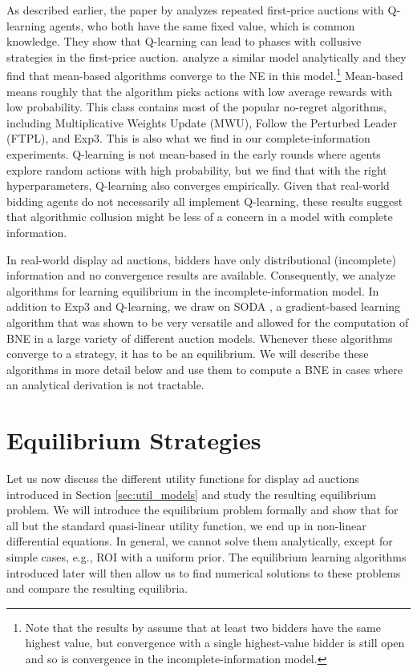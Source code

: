 \documentclass{article}
\begin{document}
As described earlier, the paper by \citet{banchio2022artificial} analyzes repeated first-price auctions with Q-learning agents, who both have the same fixed value, which is common knowledge. They show that Q-learning can lead to phases with collusive strategies in the first-price auction. \citet{deng2022nash} analyze a similar model analytically and they find that mean-based algorithms converge to the NE in this model.\footnote{Note that the results by  \citet{deng2022nash} assume that at least two bidders have the same highest value, but convergence with a single highest-value bidder is still open and so is convergence in the incomplete-information model.} 
Mean-based means roughly that the algorithm picks actions with low average rewards with low probability. 
This class contains most of the popular no-regret algorithms, including Multiplicative Weights Update (MWU), Follow the Perturbed Leader (FTPL), {and} Exp3. This is also what we find in our complete-information experiments.  
Q-learning is not mean-based in the early rounds where agents explore random actions with high probability, but we find that with the right hyperparameters, Q-learning also converges empirically. 
Given that real-world bidding agents do not necessarily all implement Q-learning, these results suggest that algorithmic collusion might be less of a concern in a model with complete information. 


In real-world display ad auctions, bidders have only distributional (incomplete) information and no convergence results are available.%
Consequently, we analyze algorithms for learning equilibrium in the incomplete-information model. In addition to Exp3 and Q-learning, we draw on SODA \citep{bichler2023soda}, a gradient-based learning algorithm that was shown to be very versatile and allowed for the computation of BNE in a large variety of different auction models. Whenever these algorithms converge to a strategy, it has to be an equilibrium. We will describe these algorithms in more detail below and use them to compute a BNE in cases where an analytical derivation is not tractable. 

\section{Equilibrium Strategies}\label{sec:equi}
Let us now discuss the different utility functions for display ad auctions introduced in Section \ref{sec:util_models} and study the resulting equilibrium problem. We will introduce the equilibrium problem formally and show that for all but the standard quasi-linear utility function, we end up in non-linear differential equations. In general, we cannot solve them analytically, except for simple cases, e.g., ROI with a uniform prior. The equilibrium learning algorithms introduced later will then allow us to find numerical solutions to these problems and compare the resulting equilibria.
\end{document}
